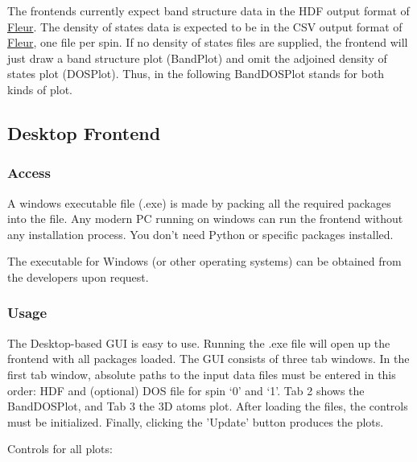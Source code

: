 The frontends currently expect band structure data in the HDF output
format of \href{http://www.judft.de}{Fleur}. The density of states data
is expected to be in the CSV output format of
\href{http://www.judft.de}{Fleur}, one file per spin. If no density of
states files are supplied, the frontend will just draw a band structure
plot (BandPlot) and omit the adjoined density of states plot (DOSPlot).
Thus, in the following BandDOSPlot stands for both kinds of plot.

\subsection{Desktop Frontend}\label{desktop-frontend}

\subsubsection{Access}\label{access}

A windows executable file (.exe) is made by packing all the required packages
into the file. Any modern PC running on windows can run the frontend without any
installation process. You don't need Python or specific packages installed.

The executable for Windows (or other operating systems) can be obtained from the developers upon request.

\subsubsection{Usage}\label{usage}

The Desktop-based GUI is easy to use. Running the .exe file will open up the
frontend with all packages loaded. The GUI consists of three tab windows. In the
first tab window, absolute paths to the input data files must be entered in this
order: HDF and (optional) DOS file for spin `0' and `1'. Tab 2 shows the
BandDOSPlot, and Tab 3 the 3D atoms plot. After loading the files, the controls
must be initialized. Finally, clicking the 'Update' button produces the plots.

Controls for all plots:

